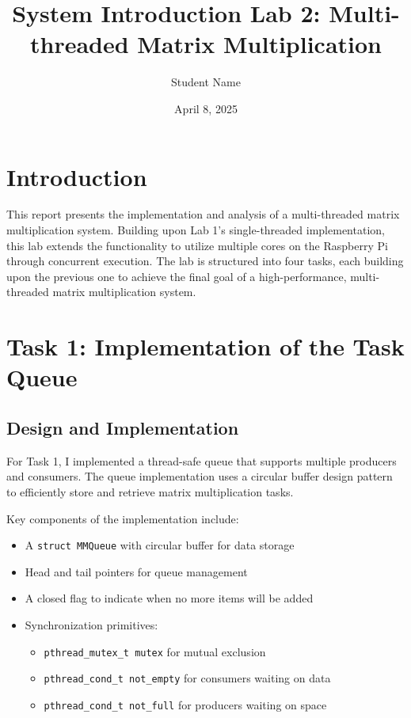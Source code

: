 \documentclass[11pt,a4paper]{article}
\title{System Introduction Lab 2: Multi-threaded Matrix Multiplication}
\author{Student Name}
\date{April 8, 2025}
\begin{document}
\maketitle

\section{Introduction}
This report presents the implementation and analysis of a multi-threaded matrix multiplication system. Building upon Lab 1's single-threaded implementation, this lab extends the functionality to utilize multiple cores on the Raspberry Pi through concurrent execution. The lab is structured into four tasks, each building upon the previous one to achieve the final goal of a high-performance, multi-threaded matrix multiplication system.

\section{Task 1: Implementation of the Task Queue}

\subsection{Design and Implementation}
For Task 1, I implemented a thread-safe queue that supports multiple producers and consumers. The queue implementation uses a circular buffer design pattern to efficiently store and retrieve matrix multiplication tasks.

Key components of the implementation include:
\begin{itemize}
    \item A \texttt{struct MMQueue} with circular buffer for data storage
    \item Head and tail pointers for queue management
    \item A closed flag to indicate when no more items will be added
    \item Synchronization primitives:
    \begin{itemize}
        \item \texttt{pthread\_mutex\_t mutex} for mutual exclusion
        \item \texttt{pthread\_cond\_t not\_empty} for consumers waiting on data
        \item \texttt{pthread\_cond\_t not\_full} for producers waiting on space
    \end{itemize}
\end{itemize}
\end{document}
